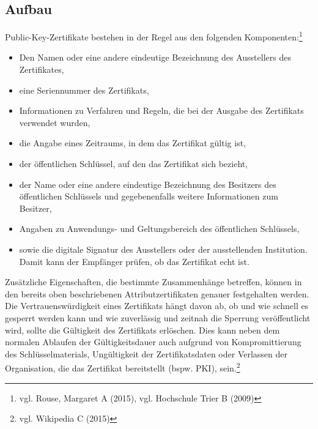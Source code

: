 \subsection{Aufbau}
Public-Key-Zertifikate bestehen in der Regel aus den folgenden Komponenten:\footnote{vgl. Rouse, Margaret A (2015), vgl. Hochschule Trier B (2009)} 
\begin{itemize}
\item Den Namen oder eine andere eindeutige Bezeichnung des Ausstellers des Zertifikates,
\item eine Seriennummer des Zertifikats,
\item Informationen zu Verfahren und Regeln, die bei der Ausgabe des Zertifikats verwendet wurden,
\item die Angabe eines Zeitraums, in dem das Zertifikat gültig ist,
\item der öffentlichen Schlüssel, auf den das Zertifikat sich bezieht,
\item der Name oder eine andere eindeutige Bezeichnung des Besitzers des öffentlichen Schlüssels und gegebenenfalls weitere Informationen zum Besitzer,
\item Angaben zu Anwendungs- und Geltungsbereich des öffentlichen Schlüssels,
\item sowie die digitale Signatur des Ausstellers oder der ausstellenden Institution. Damit kann der Empfänger prüfen, ob das Zertifikat echt ist.
\end{itemize}
Zusätzliche Eigenschaften, die bestimmte Zusammenhänge betreffen, können in den bereits oben beschriebenen Attributzertifikaten genauer festgehalten werden.
Die Vertrauenswürdigkeit eines Zertifikats hängt davon ab, ob und wie schnell es gesperrt werden kann und wie zuverlässig und zeitnah die Sperrung veröffentlicht wird, sollte die Gültigkeit des Zertifikats erlöschen. Dies kann neben dem normalen Ablaufen der Gültigkeitsdauer auch aufgrund von Kompromittierung des Schlüsselmaterials, Ungültigkeit der Zertifikatsdaten oder Verlassen der Organisation, die das Zertifikat bereitstellt (bspw. PKI), sein.\footnote{vgl. Wikipedia C (2015)}

